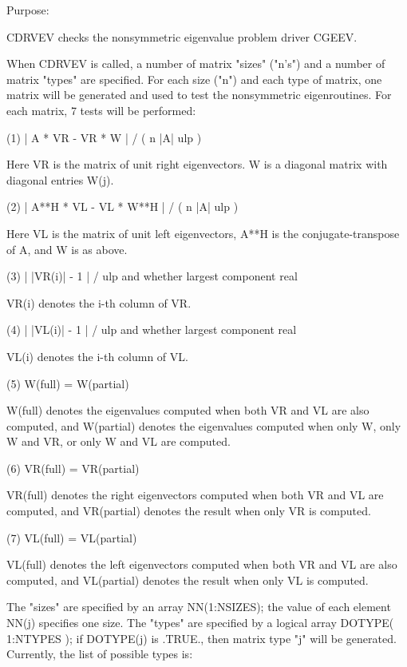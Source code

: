 \begin{DoxyParagraph}{Purpose\+: }
\begin{DoxyVerb}    CDRVEV  checks the nonsymmetric eigenvalue problem driver CGEEV.

    When CDRVEV is called, a number of matrix "sizes" ("n's") and a
    number of matrix "types" are specified.  For each size ("n")
    and each type of matrix, one matrix will be generated and used
    to test the nonsymmetric eigenroutines.  For each matrix, 7
    tests will be performed:

    (1)     | A * VR - VR * W | / ( n |A| ulp )

      Here VR is the matrix of unit right eigenvectors.
      W is a diagonal matrix with diagonal entries W(j).

    (2)     | A**H * VL - VL * W**H | / ( n |A| ulp )

      Here VL is the matrix of unit left eigenvectors, A**H is the
      conjugate-transpose of A, and W is as above.

    (3)     | |VR(i)| - 1 | / ulp and whether largest component real

      VR(i) denotes the i-th column of VR.

    (4)     | |VL(i)| - 1 | / ulp and whether largest component real

      VL(i) denotes the i-th column of VL.

    (5)     W(full) = W(partial)

      W(full) denotes the eigenvalues computed when both VR and VL
      are also computed, and W(partial) denotes the eigenvalues
      computed when only W, only W and VR, or only W and VL are
      computed.

    (6)     VR(full) = VR(partial)

      VR(full) denotes the right eigenvectors computed when both VR
      and VL are computed, and VR(partial) denotes the result
      when only VR is computed.

     (7)     VL(full) = VL(partial)

      VL(full) denotes the left eigenvectors computed when both VR
      and VL are also computed, and VL(partial) denotes the result
      when only VL is computed.

    The "sizes" are specified by an array NN(1:NSIZES); the value of
    each element NN(j) specifies one size.
    The "types" are specified by a logical array DOTYPE( 1:NTYPES );
    if DOTYPE(j) is .TRUE., then matrix type "j" will be generated.
    Currently, the list of possible types is:


\end{DoxyVerb}
\end{DoxyParagraph}
